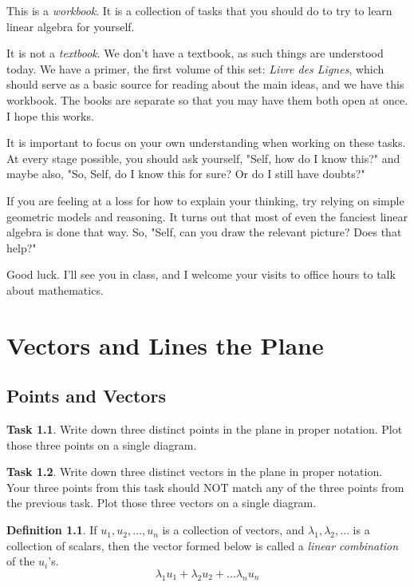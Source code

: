 \documentclass{tufte-book}
\theoremstyle{definition}
\newtheorem{task}{Task}
\newtheorem*{definition}{Definition}
\begin{document}
This is a \emph{workbook}. 
It is a collection of tasks that you should do to try to learn linear algebra for yourself.

It is not a \emph{textbook}. We don't have a textbook, as such things are understood today. We have a primer, the first volume of this set: \emph{Livre des Lignes}, which
should serve as a basic source for reading about the main ideas, and we have this workbook. The books are separate so that you may have them both open at once. I hope this works.


It is important to focus on your own understanding when working on these tasks. At every stage possible, you should ask yourself, "Self, how do I know this?" and maybe also, "So, Self, do I know this for sure? Or do I still have doubts?"

If you are feeling at a loss for how to explain your thinking, try relying on simple geometric models and reasoning. It turns out that most of even the fanciest linear algebra is done that way. So, "Self, can you draw the relevant picture? Does that help?"

Good luck. I'll see you in class, and I welcome your visits to office hours to talk about mathematics.


\mainmatter

\chapter{Vectors and Lines the Plane}
\label{ch:one}

\section*{Points and Vectors}

\begin{task}
Write down three distinct points in the plane in proper notation. 
Plot those three points on a single diagram.
\end{task}

\begin{task}
Write down three distinct vectors in the plane in proper notation. 
Your three points from this task should NOT match any of the three points from the previous task.
Plot those three vectors on a single diagram.
\end{task}

\begin{definition}
If $u_1, u_2, \ldots, u_n$ is a collection of vectors, and $\lambda_1, \lambda_2, \ldots$ is a collection of scalars, then the vector formed below is called a \emph{linear combination} of the $u_i$'s.
\[
\lambda_1 u_1 + \lambda_2 u_2 + \dots \lambda_n u_n
\]
\end{definition}
\end{document}
